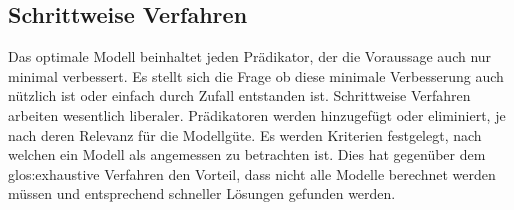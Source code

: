 \subsection{Schrittweise Verfahren} 
Das optimale Modell beinhaltet jeden Prädikator, der die Voraussage auch nur minimal verbessert. 
Es stellt sich die Frage ob diese minimale Verbesserung auch nützlich ist oder einfach durch Zufall entstanden ist. 
Schrittweise Verfahren arbeiten wesentlich liberaler.  Prädikatoren werden hinzugefügt oder eliminiert, je nach deren Relevanz für die Modellgüte. 
Es werden Kriterien festgelegt, nach welchen ein Modell als angemessen zu betrachten ist. 
Dies hat gegenüber dem \gls{glos:exhaustive Verfahren} den Vorteil, dass nicht alle Modelle berechnet werden müssen und entsprechend schneller Lösungen gefunden werden. 

